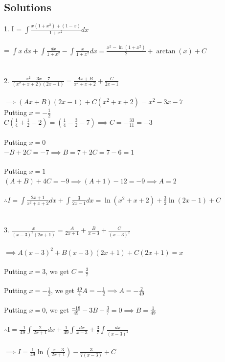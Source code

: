 \documentclass[14pt]{article}
\begin{document}
	\subsection{Solutions}
	1. I = $\displaystyle \int \frac{x(1+x^2)+(1-x)}{1+x^2}dx$
	\\ \\ = $\displaystyle \int x \ dx + \int\frac{dx}{1+x^2} -\int \frac{x}{1+x^2}dx = \boxed{\frac{x^2-\ln(1+x^2)}{2}+\arctan(x)+C}$ \\ \\ \\
	2. $\displaystyle \frac{x^2-3x-7}{(x^2+x+2)(2x-1)} = \frac{Ax+B}{x^2+x+2}+\frac{C}{2x-1}$ \\ \\ $\implies (Ax+B)(2x-1)+C(x^2+x+2) = x^2-3x-7$ \\
	Putting $\displaystyle x = -\frac{1}{2}$ \\
	$\displaystyle C \left(\frac{1}{4}+\frac{1}{2}+2\right) = \left(\frac{1}{4}-\frac{3}{2}-7\right) \implies C = -\frac{33}{11} = -3$ \\ \\
	Putting $x = 0$ \\
	$-B+2C=-7 \implies B = 7+2C = 7-6 = 1$ \\ \\
	Putting $x = 1$ \\
	$(A+B)+4C=-9 \implies (A+1)-12=-9 \implies A = 2$ \\ \\
	$\displaystyle \therefore I = \int \frac{2x+1}{x^2+x+2} dx + \int \frac{3}{2x-1}dx = \boxed{\ln(x^2+x+2)+\frac{3}{2}\ln(2x-1)+C}$ \\ \\ \\
	3. $\displaystyle \frac{x}{(x-3)^2(2x+1)} = \frac{A}{2x+1}+\frac{B}{x-3}+\frac{C}{(x-3)^2}$ \\ \\
	$\implies A(x-3)^2+B(x-3)(2x+1)+C(2x+1)=x$ \\ \\
	Putting $x = 3$, we get $\displaystyle C = \frac{3}{7}$ \\ \\
	Putting $\displaystyle x = -\frac{1}{2}$, we get $\displaystyle \frac{49}{4}A = -\frac{1}{2} \implies A = -\frac{2}{49}$ \\ \\
	Putting $x = 0$, we get $\displaystyle \frac{-18}{49}-3B+\frac{3}{7} = 0 \implies B = \frac{1}{49}$ \\ \\
	$\displaystyle \therefore \text{I} = \frac{-1}{49}\int \frac{2}{2x+1}dx + \frac{1}{49} \int \frac{dx}{x-3} + \frac{3}{7} \int \frac{dx}{(x-3)^2}$ \\ \\
	$\displaystyle \implies I = \boxed{\frac{1}{49}\ln\left(\frac{x-3}{2x+1}\right) - \frac{3}{7(x-3)}+C}$
\end{document}
